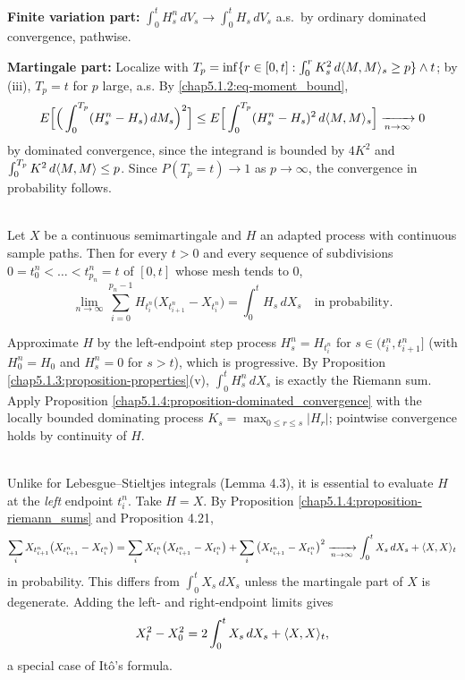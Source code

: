 \begin{proofidea}
\textbf{Finite variation part:} $\int_0^t H^n_s\,dV_s\to\int_0^t H_s\,dV_s$ a.s.\ by ordinary dominated convergence, pathwise.

\textbf{Martingale part:} Localize with $T_p=\inf\{r\in[0,t]:\int_0^r K_s^2\,d\langle M,M\rangle_s\geq p\}\wedge t$; by (iii), $T_p=t$ for $p$ large, a.s. By \eqref{chap5.1.2:eq-moment_bound},
$$E\Big[\Big(\int_0^{T_p}(H^n_s-H_s)\,dM_s\Big)^2\Big]\leq E\Big[\int_0^{T_p}(H^n_s-H_s)^2\,d\langle M,M\rangle_s\Big]\xrightarrow[n\to\infty]{}0$$
by dominated convergence, since the integrand is bounded by $4K^2$ and $\int_0^{T_p}K^2\,d\langle M,M\rangle\leq p$. Since $P(T_p=t)\to1$ as $p\to\infty$, the convergence in probability follows.
\end{proofidea}

\begin{proposition}\label{chap5.1.4:proposition-riemann_sums}
\\
Let $X$ be a continuous semimartingale and $H$ an adapted process with continuous sample paths. Then for every $t>0$ and every sequence of subdivisions $0=t^n_0<\dots<t^n_{p_n}=t$ of $[0,t]$ whose mesh tends to $0$,
$$\lim_{n\to\infty}\sum_{i=0}^{p_n-1}H_{t^n_i}\big(X_{t^n_{i+1}}-X_{t^n_i}\big)=\int_0^t H_s\,dX_s\quad\text{in probability.}$$
\end{proposition}

\begin{proofidea}
Approximate $H$ by the left-endpoint step process $H^n_s=H_{t^n_i}$ for $s\in(t^n_i,t^n_{i+1}]$ (with $H^n_0=H_0$ and $H^n_s=0$ for $s>t$), which is progressive. By Proposition \ref{chap5.1.3:proposition-properties}(v), $\int_0^t H^n_s\,dX_s$ is exactly the Riemann sum. Apply Proposition \ref{chap5.1.4:proposition-dominated_convergence} with the locally bounded dominating process $K_s=\max_{0\leq r\leq s}|H_r|$; pointwise convergence holds by continuity of $H$.
\end{proofidea}

\begin{remark}\label{chap5.1.4:remark-left_endpoint}
\\
Unlike for Lebesgue--Stieltjes integrals (Lemma 4.3), it is essential to evaluate $H$ at the \textit{left} endpoint $t^n_i$. Take $H=X$. By Proposition \ref{chap5.1.4:proposition-riemann_sums} and Proposition 4.21,
$$\sum_{i}X_{t^n_{i+1}}\big(X_{t^n_{i+1}}-X_{t^n_i}\big)=\sum_i X_{t^n_i}\big(X_{t^n_{i+1}}-X_{t^n_i}\big)+\sum_i\big(X_{t^n_{i+1}}-X_{t^n_i}\big)^2\xrightarrow[n\to\infty]{}\int_0^t X_s\,dX_s+\langle X,X\rangle_t$$
in probability. This differs from $\int_0^t X_s\,dX_s$ unless the martingale part of $X$ is degenerate. Adding the left- and right-endpoint limits gives
$$X_t^2-X_0^2=2\int_0^t X_s\,dX_s+\langle X,X\rangle_t,$$
a special case of Itô's formula.
\end{remark}

